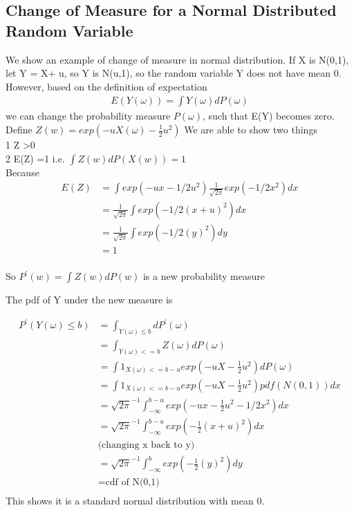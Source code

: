 \documentclass[a4paper]{article}
\begin{document}
\subsection{Change of Measure for a Normal Distributed Random Variable}
We show an example of change of measure in normal distribution. If X is N(0,1), let Y = X+ u, so Y is N(u,1), so the random variable Y does not have mean 0. However, based
on the definition of expectation\\
\begin{align*}
	E(Y(\omega)) = \int Y(\omega) dP(\omega)
\end{align*}
we can change the probability measure $P(\omega)$, such that E(Y) becomes zero.
Define $Z(w) = exp(-uX(\omega) - \frac{1}{2}u^2)$
We are able to show two things\\ 
1 Z \textgreater 0 \\
2 E(Z) =1 i.e. $\int Z(w)dP(X(w)) = 1$ \\
Because 
\begin{align*}
E(Z)  & = \int exp(-ux-1/2u^2) \frac{1}{\sqrt{2\pi}} exp(-1/2x^2) dx\\
& = \frac{1}{\sqrt{2\pi}}  \int exp(-1/2(x+u)^2) dx \\
& = \frac{1}{\sqrt{2\pi}}  \int exp(-1/2(y)^2) dy \\
& = 1 \\
\end{align*}

So $P^{'}(w) = \int Z(w) dP(w)$ is a new probability measure

The pdf of Y under the new measure is

\begin{align*}
	P^{'}(Y(\omega) \leq b) & = \int_{Y(\omega) \leq b} d P^{'}(\omega) \\
&= \int_{Y(\omega)<=b} Z(\omega) dP(\omega) \\
&= \int 1_{X(\omega)<=b-u} exp(-uX- \frac{1}{2} u^2 )dP(\omega) \\
&=\int 1_{X(\omega)<=b-u} exp(-uX- \frac{1}{2} u^2 ) pdf(N(0,1)) dx \\
&=  {\sqrt{2\pi}}^{-1} \int_{-\infty}^{b-u} exp(-ux -\frac{1}{2}u^2 -1/2x^2) dx \\
&=  {\sqrt{2\pi}}^{-1}\int_{-\infty}^{b-u} exp(-\frac{1}{2} (x+u)^2) dx \\
&\textrm{(changing x back to y)}\\
&=  {\sqrt{2\pi}}^{-1}\int _{-\infty}^{b} exp(-\frac{1}{2} (y)^2) dy \\
&= \textrm{cdf of N(0,1)} \\
\end{align*}
This shows it is a standard normal distribution with mean 0.\\
\end{document}
